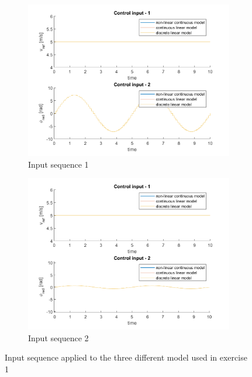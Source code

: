 \begin{figure}[H]
    \centering
     \begin{subfigure}[b]{0.45\textwidth}
         \centering
         \includegraphics[width=\textwidth]{Latex report/image/ex1/input1.png}
         \caption{Input sequence 1}
         \label{fig:input11}
     \end{subfigure}
     \begin{subfigure}[b]{0.45\textwidth}
         \centering
         \includegraphics[width=\textwidth]{Latex report/image/ex1/input2.png}
         \caption{Input sequence 2}
         \label{fig:inpu12}
     \end{subfigure}
    \caption{Input sequence applied to the three different model used in exercise 1}
    \label{fig:inputEx1}
\end{figure}

